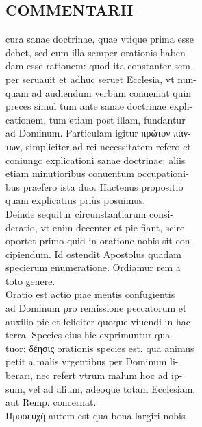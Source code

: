 \documentclass{article}
\begin{document}
\begin{pages}
\section*{COMMENTARII \\
                }
cura sanae doctrinae, quae vtique prima esse \\
                debet, sed cum illa semper orationis haben- \\
                dam esse rationem: quod ita constanter sem- \\
                per seruauit et adhuc seruet Ecclesia, vt nun- \\
                quam ad audiendum verbum conueniat quin \\
                preces simul tum ante sanae doctrinae expli- \\
                cationem, tum etiam post illam, fundantur \\
                ad Dominum. Particulam igitur πρῶτον πάν- \\
                των, simpliciter ad rei necessitatem refero et \\
                coniungo explicationi sanae doctrinae: aliis \\
                etiam minutioribus conuentum occupationi- \\
                bus praefero ista duo. Hactenus propositio \\
                quam explicatius priùs posuimus. \\
                Deinde sequitur circunstantiarum consi- \\
                deratio, vt enim decenter et pie fiant, scire \\
                oportet primo quid in oratione nobis sit con- \\
                cipiendum. Id ostendit Apostolus quadam \\
                specierum enumeratione. Ordiamur rem a \\
                toto genere. \\
                Oratio est actio piae mentis confugientis \\
                ad Dominum pro remissione peccatorum et \\
                auxilio pie et feliciter quoque viuendi in hac \\
                terra. Species eius hic exprimuntur qua- \\
                tuor: δέησις orationis species est, qua animus \\
                petit a malis vrgentibus per Dominum li- \\
                berari, nec refert vtrum malum hoc ad ip- \\
                sum, vel ad alium, adeoque totam Ecclesiam, \\
                aut Remp. concernat. \\
                Προσευχὴ autem est qua bona largiri nobis \\
                

\end{pages}
\end{document}

